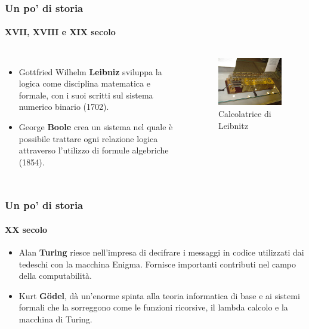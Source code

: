 \documentclass[11pt]{beamer}
\begin{document}
    \begin{frame}
        \frametitle{Un po' di storia}
        \framesubtitle{XVII, XVIII e XIX secolo}
        
        \begin{columns}
            \begin{itemize}
                \item Gottfried Wilhelm \textbf{Leibniz} sviluppa la logica come disciplina matematica e formale, con i suoi scritti sul \alert{sistema numerico binario} (1702).
                
                \item George \textbf{Boole} crea un sistema nel quale è possibile trattare ogni relazione logica attraverso l'utilizzo di \alert{formule algebriche} (1854).
            \end{itemize}
            
            \begin{figure}
                \includegraphics[scale=0.4]{img/calcolatrice-leibnitz.jpg}
                \caption{Calcolatrice di Leibnitz}
            \end{figure}
        \end{columns}
    \end{frame}

    \begin{frame}
        \frametitle{Un po' di storia}
        \framesubtitle{XX secolo}
        
        \begin{itemize}
            \item Alan \textbf{Turing} riesce nell'impresa di decifrare i messaggi in codice utilizzati dai tedeschi con la macchina Enigma. Fornisce importanti contributi nel campo della \alert{computabilità}.
            
            \item Kurt \textbf{Gödel}, dà un'enorme spinta alla teoria informatica di base e ai sistemi formali che la sorreggono come le \alert{funzioni ricorsive}, il \alert{lambda calcolo} e la \alert{macchina di Turing}.
        \end{itemize}
    \end{frame}
\end{document}
